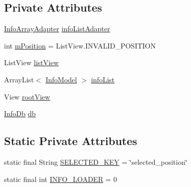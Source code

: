 \subsection*{Private Attributes}
\begin{DoxyCompactItemize}
\item 
\hyperlink{classorg_1_1buildmlearn_1_1toolkit_1_1infotemplate_1_1adapter_1_1InfoArrayAdapter}{Info\+Array\+Adapter} \hyperlink{classorg_1_1buildmlearn_1_1toolkit_1_1infotemplate_1_1fragment_1_1MainActivityFragment_a8ce0ad55addc14328ecb0feff6715b71}{info\+List\+Adapter}
\item 
int \hyperlink{classorg_1_1buildmlearn_1_1toolkit_1_1infotemplate_1_1fragment_1_1MainActivityFragment_a09efab9b208d2d8eae1a3c435f08270c}{m\+Position} = List\+View.\+I\+N\+V\+A\+L\+I\+D\+\_\+\+P\+O\+S\+I\+T\+I\+ON
\item 
List\+View \hyperlink{classorg_1_1buildmlearn_1_1toolkit_1_1infotemplate_1_1fragment_1_1MainActivityFragment_a167f0827413d223c40cc83de5a6f9950}{list\+View}
\item 
Array\+List$<$ \hyperlink{classorg_1_1buildmlearn_1_1toolkit_1_1infotemplate_1_1data_1_1InfoModel}{Info\+Model} $>$ \hyperlink{classorg_1_1buildmlearn_1_1toolkit_1_1infotemplate_1_1fragment_1_1MainActivityFragment_a59ffb2eb37ff5f2e23d217ce99bed4f6}{info\+List}
\item 
View \hyperlink{classorg_1_1buildmlearn_1_1toolkit_1_1infotemplate_1_1fragment_1_1MainActivityFragment_a84e5e1104c11cdeb372150575d0afa67}{root\+View}
\item 
\hyperlink{classorg_1_1buildmlearn_1_1toolkit_1_1infotemplate_1_1data_1_1InfoDb}{Info\+Db} \hyperlink{classorg_1_1buildmlearn_1_1toolkit_1_1infotemplate_1_1fragment_1_1MainActivityFragment_a35165db535b929ec5bbf91ebc8368545}{db}
\end{DoxyCompactItemize}
\subsection*{Static Private Attributes}
\begin{DoxyCompactItemize}
\item 
static final String \hyperlink{classorg_1_1buildmlearn_1_1toolkit_1_1infotemplate_1_1fragment_1_1MainActivityFragment_a32e713240eae9424c533794661ed9443}{S\+E\+L\+E\+C\+T\+E\+D\+\_\+\+K\+EY} = \char`\"{}selected\+\_\+position\char`\"{}
\item 
static final int \hyperlink{classorg_1_1buildmlearn_1_1toolkit_1_1infotemplate_1_1fragment_1_1MainActivityFragment_a24ddd3a581846988286fdeb83daa9c1b}{I\+N\+F\+O\+\_\+\+L\+O\+A\+D\+ER} = 0
\end{DoxyCompactItemize}


